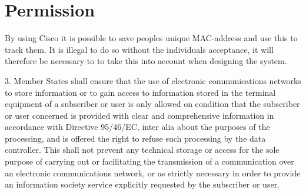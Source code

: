 \section{Permission}
By using Cisco it is possible to save peoples unique MAC-address and use this to track them. It is illegal to do so without the individuals acceptance, it will therefore be necessary to to take this into account when designing the system.



3. Member States shall ensure that the use of electronic communications networks to store information or to gain access to information stored in the terminal equipment of a subscriber or user is only allowed on condition that the subscriber or user concerned is provided with clear and comprehensive information in accordance with Directive 95/46/EC, inter alia about the purposes of the processing, and is offered the right to refuse such processing by the data controller. This shall not prevent any technical storage or access for the sole purpose of carrying out or facilitating the transmission of a communication over an electronic communications network, or as strictly necessary in order to provide an information society service explicitly requested by the subscriber or user.
